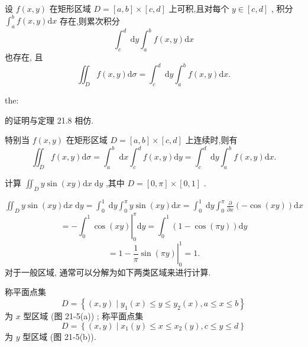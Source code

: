  设 \(f\left( {x,y}\right)\) 在矩形区域 \(D = \left\lbrack  {a,b}\right\rbrack   \times  \left\lbrack  {c,d}\right\rbrack\) 上可积,且对每个 \(y \in  \left\lbrack  {c,d}\right\rbrack\) , 积分 \({\int }_{a}^{b}f\left( {x,y}\right) \mathrm{d}x\) 存在,则累次积分
\[
{\int }_{c}^{d}\mathrm{\;d}y{\int }_{a}^{b}f\left( {x,y}\right) \mathrm{d}x
\]
也存在, 且
\[
{\iint }_{D}f\left( {x,y}\right) \mathrm{d}\sigma  = {\int }_{c}^{d}\mathrm{\;d}y{\int }_{a}^{b}f\left( {x,y}\right) \mathrm{d}x.
\]
\begin{theorem}{}{the:}

\end{theorem}
 的证明与定理 21.8 相仿.

特别当 \(f\left( {x,y}\right)\) 在矩形区域 \(D = \left\lbrack  {a,b}\right\rbrack   \times  \left\lbrack  {c,d}\right\rbrack\) 上连续时,则有
\[
{\iint }_{D}f\left( {x,y}\right) \mathrm{d}\sigma  = {\int }_{a}^{b}\mathrm{\;d}x{\int }_{c}^{d}f\left( {x,y}\right) \mathrm{d}y = {\int }_{c}^{d}\mathrm{\;d}y{\int }_{a}^{b}f\left( {x,y}\right) \mathrm{d}x.
\]
\begin{example}

\end{example}
计算 \({\iint }_{D}y\sin \left( {xy}\right) \mathrm{d}x\mathrm{\;d}y\) ,其中 \(D = \left\lbrack  {0,\pi }\right\rbrack   \times  \left\lbrack  {0,1}\right\rbrack\) .

\begin{solution}

\end{solution}
\({\iint }_{D}y\sin \left( {xy}\right) \mathrm{d}x\mathrm{\;d}y = {\int }_{0}^{1}\mathrm{\;d}y{\int }_{0}^{\pi }y\sin \left( {xy}\right) \mathrm{d}x = {\int }_{0}^{1}\mathrm{\;d}y{\int }_{0}^{\pi }\frac{\partial }{\partial x}\left( {-\cos \left( {xy}\right) }\right) \mathrm{d}x\)
\[
=  - {\left. {\int }_{0}^{1}\cos \left( xy\right) \right| }_{0}^{\pi }\mathrm{d}y = {\int }_{0}^{1}\left( {1 - \cos \left( {\pi y}\right) }\right) \mathrm{d}y
\]
\[
= 1 - {\left. \frac{1}{\pi }\sin \left( \pi y\right) \right| }_{0}^{1} = 1.
\]
对于一般区域, 通常可以分解为如下两类区域来进行计算.

称平面点集
\[
D = \left\{  {\left( {x,y}\right)  \mid  {y}_{1}\left( x\right)  \leq  y \leq  {y}_{2}\left( x\right) ,a \leq  x \leq  b}\right\}   \tag{4}
\]
为 \(x\) 型区域 (图 21-5(a)) ; 称平面点集
\[
D = \left\{  {\left( {x,y}\right)  \mid  {x}_{1}\left( y\right)  \leq  x \leq  {x}_{2}\left( y\right) ,c \leq  y \leq  d}\right\}   \tag{5}
\]
为 \(y\) 型区域 (图 21-5(b)).

